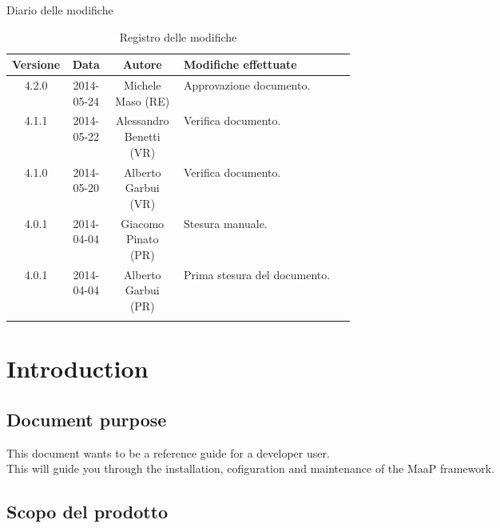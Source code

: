 
\newpage
Diario delle modifiche
\begin{center}
\begin{longtable}{|c|c|c|p{0.5\linewidth}|}
\toprule
\textbf{Versione} & \textbf{Data} & \textbf{Autore} & \textbf{Modifiche effettuate}\\

\midrule
4.2.0 & 2014-05-24 & Michele Maso (RE) & Approvazione documento.\\
\midrule
4.1.1 & 2014-05-22 & Alessandro Benetti (VR) & Verifica documento.\\
\midrule
4.1.0 & 2014-05-20 & Alberto Garbui (VR) & Verifica documento.\\

\midrule
4.0.1 & 2014-04-04 & Giacomo Pinato (PR) & Stesura manuale.\\
\midrule
4.0.1 & 2014-04-04 & Alberto Garbui (PR) & Prima stesura del documento.\\

\bottomrule
\caption{Registro delle modifiche}
\label{tab:changelog}

\end{longtable}
\end{center}

\newpage
\tableofcontents

\newpage
\listoffigures %

\newpage
\section{Introduction}
\subsection{Document purpose}
This document wants to be a reference guide for a developer user. \\
This will guide you through the installation, cofiguration and maintenance of the MaaP framework.

\subsection{Scopo del prodotto}
\Prodotto{}

